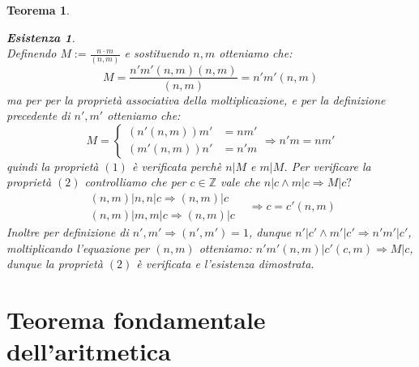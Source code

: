 \documentclass{article}
\makeatletter
\renewenvironment{proof}[1][\proofname]{\par
    \pushQED{\qed}%
    \normalfont \topsep6\p@\@plus6\p@\relax
    \trivlist
    \item\relax
    {\itshape
    #1\@addpunct{.}}\hspace\labelsep\ignorespaces
    }{%
    \popQED\endtrivlist\@endpefalse
}
\newtheorem{theorem}{Teorema}[part]
\theoremstyle{definition}
\newtheorem*{existence}{Esistenza}
\makeatother
\begin{document}
\begin{theorem}
\begin{proof}
\begin{existence}
\[            \]
            Definendo \(M:=\frac{n\cdot m}{(n,m)}\) e sostituendo \(n,m\) otteniamo che:
            \[
                M=\frac{n'm'(n,m)(n,m)}{(n,m)}=n'm'(n,m)
            \]
            ma per per la proprietà associativa della moltiplicazione, e per la definizione precedente di \(n',m'\) otteniamo che: 
            \[
                M=\begin {cases}
                    (n'(n,m))m'&=nm'\\
                    (m'(n,m))n'&=n'm
                \end{cases}\Rightarrow n'm = nm'
            \]
            quindi la proprietà \((1)\) è verificata perchè \(n|M\) e \(m|M\).
            Per verificare la proprietà \((2)\) controlliamo che per \(c\in\mathbb{Z}\) vale che \(n|c\land m|c\Rightarrow M|c?\)
            \[
                \begin{aligned}
                (n,m)|n,n|c\Rightarrow (n,m)|c&\\
                (n,m)|m,m|c\Rightarrow (n,m)|c&
                \end{aligned}\Rightarrow c=c'(n,m)
            \]
            Inoltre per definizione di \(n',m'\Rightarrow(n',m')=1\), dunque \(n'|c'\land m'|c'\Rightarrow n'm'|c'\), moltiplicando l'equazione per \((n,m)\) otteniamo: \(n'm'(n,m)|c'(c,m)\Rightarrow M|c\), dunque la proprietà \((2)\) è verificata e l'esistenza dimostrata.
        \end{existence}
        \raggedleft{\pushQED{\ensuremath{\blacksquare}}}
    \end{proof}
\end{theorem}
\pagebreak
\part{Teorema fondamentale dell'aritmetica}
\end{document}
